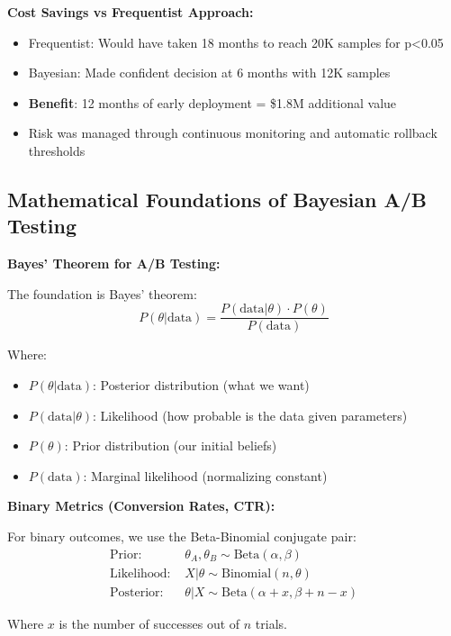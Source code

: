 \textbf{Cost Savings vs Frequentist Approach:}
\begin{itemize}
    \item Frequentist: Would have taken 18 months to reach 20K samples for p<0.05
    \item Bayesian: Made confident decision at 6 months with 12K samples
    \item \textbf{Benefit}: 12 months of early deployment = \$1.8M additional value
    \item Risk was managed through continuous monitoring and automatic rollback thresholds
\end{itemize}

\subsection{Mathematical Foundations of Bayesian A/B Testing}

\textbf{Bayes' Theorem for A/B Testing:}

The foundation is Bayes' theorem:
\begin{equation}
P(\theta | \text{data}) = \frac{P(\text{data} | \theta) \cdot P(\theta)}{P(\text{data})}
\end{equation}

Where:
\begin{itemize}
    \item $P(\theta | \text{data})$: Posterior distribution (what we want)
    \item $P(\text{data} | \theta)$: Likelihood (how probable is the data given parameters)
    \item $P(\theta)$: Prior distribution (our initial beliefs)
    \item $P(\text{data})$: Marginal likelihood (normalizing constant)
\end{itemize}

\textbf{Binary Metrics (Conversion Rates, CTR):}

For binary outcomes, we use the Beta-Binomial conjugate pair:
\begin{align}
\text{Prior: } & \theta_A, \theta_B \sim \text{Beta}(\alpha, \beta) \\
\text{Likelihood: } & X | \theta \sim \text{Binomial}(n, \theta) \\
\text{Posterior: } & \theta | X \sim \text{Beta}(\alpha + x, \beta + n - x)
\end{align}

Where $x$ is the number of successes out of $n$ trials.

